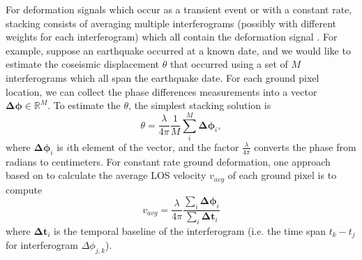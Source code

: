 For deformation signals which occur as a transient event 
or with a constant rate, stacking consists of averaging multiple interferograms (possibly with different weights for each interferogram) which all contain the deformation signal \citep{Simons2007InterferometricSyntheticAperture, Zheng2019ImagingCascadiaSlow}. 
For example, suppose an earthquake occurred at a known date, and we would like to estimate the coseismic displacement $\theta$ that occurred using a set of $M$ interferograms which all span the earthquake date. For each ground pixel location, we can collect the phase differences measurements into a vector $\bm{\Delta \phi} \in \mathbb{R}^{M} $.
To estimate the $\theta$, the simplest stacking solution is
\begin{equation}
	\theta = \frac{\lambda }{4 \pi} \frac{1}{M} \sum_i^M \bm{\Delta \phi}_i ,
	\label{eq:ch3-stacking-1}
\end{equation}
where $\bm{\Delta \phi}_i$ is $i$th element of the vector, and the factor $  \frac{\lambda }{4 \pi} $ converts the phase from radians to centimeters.
For constant rate ground deformation, one approach based on \citep{Sandwell1998PhaseGradientApproach} to calculate the average LOS velocity $v_{avg}$ of each ground pixel is to compute
\begin{equation}
	v_{avg} = \frac{\lambda }{4 \pi} \frac{\sum_i \bm{\Delta \phi}_i}{\sum_i \bm{\Delta t}_i }
	\label{eq:ch3-stacking-2}
\end{equation}
where $ \bm{\Delta t}_i $ is the temporal baseline of the interferogram (i.e. the time span $t_k - t_j$  for interferogram $ \Delta \phi_{j, k} $). %




